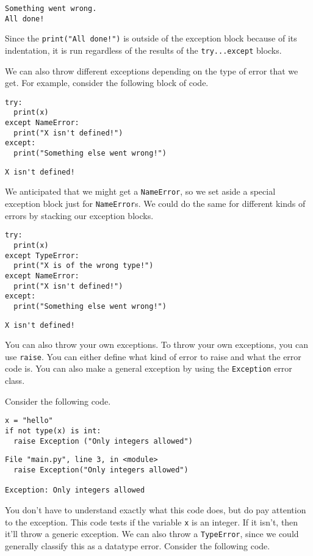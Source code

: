 \begin{lstlisting}
Something went wrong.
All done!
\end{lstlisting}
Since the \verb|print("All done!")| is outside of the exception block because of its indentation, it is run regardless of the results of the \verb|try...except| blocks.\par
We can also throw different exceptions depending on the type of error that we get. For example, consider the following block of code.
\begin{lstlisting}[style=pippython]
try:
  print(x)
except NameError:
  print("X isn't defined!")
except:
  print("Something else went wrong!")
\end{lstlisting}
\begin{lstlisting}[style=none]
X isn't defined!
\end{lstlisting}
We anticipated that we might get a \verb|NameError|, so we set aside a special exception block just for \verb|NameError|s. We could do the same for different kinds of errors by stacking our exception blocks.\par
\begin{lstlisting}[style=pippython]
try:
  print(x)
except TypeError:
  print("X is of the wrong type!")
except NameError:
  print("X isn't defined!")
except:
  print("Something else went wrong!")
\end{lstlisting}
\begin{lstlisting}[style=none]
X isn't defined!
\end{lstlisting}
You can also throw your own exceptions. To throw your own exceptions, you can use \verb|raise|. You can either define what kind of error to raise and what the error code is. You can also make a general exception by using the \verb|Exception| error class.\par
Consider the following code.
\begin{lstlisting}[style=pippython]
x = "hello"
if not type(x) is int:
  raise Exception ("Only integers allowed")
\end{lstlisting}
\begin{lstlisting}[style=none]
File "main.py", line 3, in <module>
  raise Exception("Only integers allowed")
  
Exception: Only integers allowed
\end{lstlisting}
You don't have to understand exactly what this code does, but do pay attention to the exception. This code tests if the variable \verb|x| is an integer. If it isn't, then it'll throw a generic exception. We can also throw a \verb|TypeError|, since we could generally classify this as a datatype error. Consider the following code.\par
